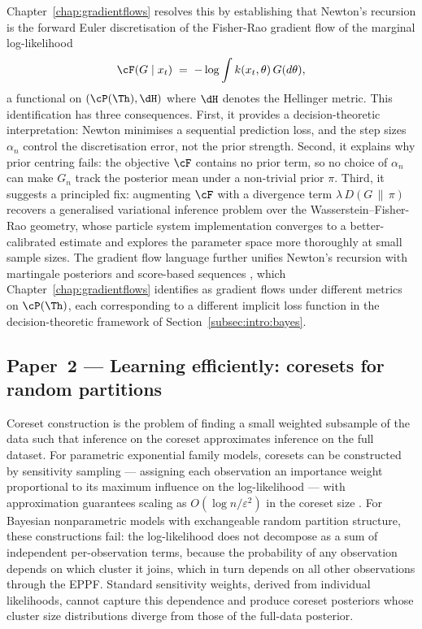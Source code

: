 Chapter~\ref{chap:gradientflows} resolves this by establishing that
Newton's recursion is the forward Euler discretisation of the Fisher-Rao
gradient flow of the marginal log-likelihood
\begin{equation}
  \cF(G \mid x_t)
  \;=\;
  -\log \int k(x_t, \theta)\, G(d\theta),
  \label{eq:marginal-loglik}
\end{equation}
a functional on $(\cP(\Th), \dH)$ where $\dH$ denotes the Hellinger
metric.  This identification has three consequences.  First, it provides a
decision-theoretic interpretation: Newton minimises a sequential prediction
loss, and the step sizes $\alpha_n$ control the discretisation error, not
the prior strength.  Second, it explains why prior centring fails: the
objective $\cF$ contains no prior term, so no choice of $\alpha_n$ can
make $G_n$ track the posterior mean under a non-trivial prior $\pi$.
Third, it suggests a principled fix: augmenting $\cF$ with a divergence
term $\lambda\, D(G \,\|\, \pi)$ recovers a generalised variational
inference problem \citep{KnoblauchJewsonDamoulas2022} over the
Wasserstein--Fisher-Rao geometry, whose particle system implementation
converges to a better-calibrated estimate and explores the parameter space
more thoroughly at small sample sizes.  The gradient flow language further
unifies Newton's recursion with martingale posteriors and score-based
sequences \citep{WalkerHolmes2024}, which
Chapter~\ref{chap:gradientflows} identifies as gradient flows under
different metrics on $\cP(\Th)$, each corresponding to a different implicit
loss function in the decision-theoretic framework of
Section~\ref{subsec:intro:bayes}.

\subsection{Paper~2 --- Learning efficiently: coresets for random partitions}
\label{subsec:intro:paper2}

Coreset construction is the problem of finding a small weighted subsample
of the data such that inference on the coreset approximates inference on
the full dataset.  For parametric exponential family models, coresets can
be constructed by sensitivity sampling --- assigning each observation an
importance weight proportional to its maximum influence on the
log-likelihood --- with approximation guarantees scaling as $O(\log n /
\varepsilon^2)$ in the coreset size \citep{HugginsCampbellBroderick2016,
CampbellBroderick2018}.  For Bayesian nonparametric models with
exchangeable random partition structure, these constructions fail: the
log-likelihood does not decompose as a sum of independent per-observation
terms, because the probability of any observation depends on which cluster
it joins, which in turn depends on all other observations through the EPPF.
Standard sensitivity weights, derived from individual likelihoods, cannot
capture this dependence and produce coreset posteriors whose cluster size
distributions diverge from those of the full-data posterior.

